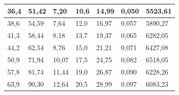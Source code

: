 \documentclass[a4paper,12pt]{article} %
\begin{document}
\begin{table}[h!]
\begin{tabular}{|l|l|l|l|l|l|l|}
		36,4                                      & 51,42                                                   & 7,20                                                  & 10,6                                     & 14,99                                                   & 0,050                        & 5523,61                                         \\ \hline
		38,6                                      & 54,59                                                   & 7,64                                                  & 12,0                                     & 16,97                                                   & 0,057                        & 5890,27                                         \\ \hline
		41,3                                      & 58,44                                                   & 8,18                                                  & 13,7                                     & 19,37                                                   & 0,065                        & 6282,05                                         \\ \hline
		44,2                                      & 62,54                                                   & 8,76                                                  & 15,0                                     & 21,21                                                   & 0,071                        & 6427,08                                         \\ \hline
		50,9                                      & 71,94                                                   & 10,07                                                 & 17,5                                     & 24,75                                                   & 0,082                        & 6518,05                                         \\ \hline
		57,8                                      & 81,74                                                   & 11,44                                                 & 19,0                                     & 26,87                                                   & 0,090                         & 6228,26                                         \\ \hline
		63,9                                      & 90,30                                                   & 12,64                                                 & 20,5                                     & 28,99                                                   & 0,097                        & 6083,23                                         \\ \hline

\end{tabular}
\end{table}
\end{document}
